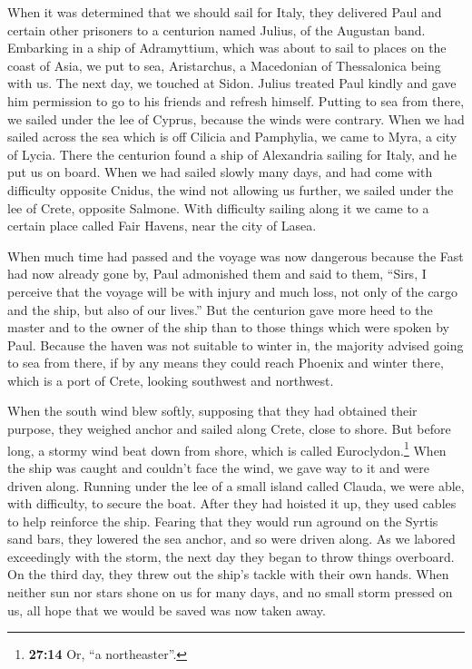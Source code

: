  When it was determined that we should sail for Italy,
they delivered Paul and certain other prisoners to a centurion named
Julius, of the Augustan band.  Embarking in a ship of
Adramyttium, which was about to sail to places on the coast of Asia, we
put to sea, Aristarchus, a Macedonian of Thessalonica being with us.
 The next day, we touched at Sidon. Julius treated Paul
kindly and gave him permission to go to his friends and refresh himself.
 Putting to sea from there, we sailed under the lee of
Cyprus, because the winds were contrary.  When we had
sailed across the sea which is off Cilicia and Pamphylia, we came to
Myra, a city of Lycia.  There the centurion found a ship
of Alexandria sailing for Italy, and he put us on board. 
When we had sailed slowly many days, and had come with difficulty
opposite Cnidus, the wind not allowing us further, we sailed under the
lee of Crete, opposite Salmone.  With difficulty sailing
along it we came to a certain place called Fair Havens, near the city of
Lasea.

 When much time had passed and the voyage was now
dangerous because the Fast had now already gone by, Paul admonished them
 and said to them, ``Sirs, I perceive that the voyage
will be with injury and much loss, not only of the cargo and the ship,
but also of our lives.''  But the centurion gave more
heed to the master and to the owner of the ship than to those things
which were spoken by Paul.  Because the haven was not
suitable to winter in, the majority advised going to sea from there, if
by any means they could reach Phoenix and winter there, which is a port
of Crete, looking southwest and northwest.

 When the south wind blew softly, supposing that they had
obtained their purpose, they weighed anchor and sailed along Crete,
close to shore.  But before long, a stormy wind beat down
from shore, which is called Euroclydon.\footnote{\textbf{27:14} Or, ``a
  northeaster''.}  When the ship was caught and couldn't
face the wind, we gave way to it and were driven along. 
Running under the lee of a small island called Clauda, we were able,
with difficulty, to secure the boat.  After they had
hoisted it up, they used cables to help reinforce the ship. Fearing that
they would run aground on the Syrtis sand bars, they lowered the sea
anchor, and so were driven along.  As we labored
exceedingly with the storm, the next day they began to throw things
overboard.  On the third day, they threw out the ship's
tackle with their own hands.  When neither sun nor stars
shone on us for many days, and no small storm pressed on us, all hope
that we would be saved was now taken away.


